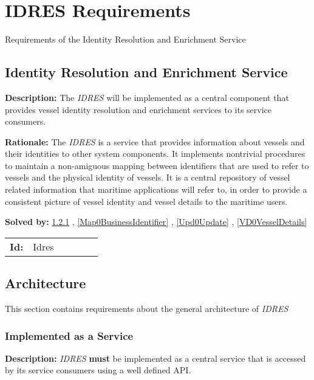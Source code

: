 \chapter{IDRES Requirements}
Requirements of the Identity Resolution and Enrichment Service
\section{Identity Resolution and Enrichment Service}\label{Idres}
\textbf{Description:} The \textsl{IDRES} will be implemented as a  central component that provides vessel identity resolution and enrichment services  to its service consumers.

\textbf{Rationale:} The \textsl{IDRES} is a service that provides information about vessels and their identities to other system components. It implements nontrivial procedures to maintain a non-amiguous mapping between identifiers that are used to refer to vessels and the physical identity of vessels. It is a central repository of vessel related information that maritime applications will refer to, in order to provide a consistent picture of vessel identity and vessel details to the maritime users.

\textbf{Solved by:} \ref{Arch0Service} , \ref{Map0BusinessIdentifier} , \ref{Upd0Update} , \ref{VD0VesselDetails} 

\par
{\small \begin{center}\begin{tabular}{rlrlrl}
\textbf{Id:} & Idres  & & & \end{tabular}\end{center} }

\section{Architecture}
This section contains requirements about the general architecture of \textsl{IDRES}
\subsection{Implemented as a Service}\label{Arch0Service}
\textbf{Description:} \textsl{IDRES} \textbf{must} be implemented as a central service that is accessed by its service consumers using a well defined API.

